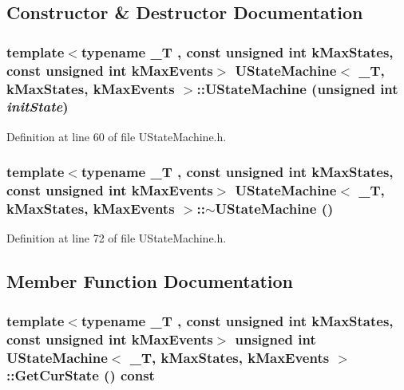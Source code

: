 \subsection{Constructor \& Destructor Documentation}
\hypertarget{class_u_state_machine_482d71ab249a93962a3e969c7cb8820b}{
\subsubsection[{UStateMachine}]{\setlength{\rightskip}{0pt plus 5cm}template$<$typename \_\-T , const unsigned int kMaxStates, const unsigned int kMaxEvents$>$ {\bf UStateMachine}$<$ \_\-T, kMaxStates, kMaxEvents $>$::{\bf UStateMachine} (unsigned int {\em initState})}}
\label{class_u_state_machine_482d71ab249a93962a3e969c7cb8820b}




Definition at line 60 of file UStateMachine.h.\hypertarget{class_u_state_machine_55bfac71d1d2793f130f351151e12768}{
\subsubsection[{$\sim$UStateMachine}]{\setlength{\rightskip}{0pt plus 5cm}template$<$typename \_\-T , const unsigned int kMaxStates, const unsigned int kMaxEvents$>$ {\bf UStateMachine}$<$ \_\-T, kMaxStates, kMaxEvents $>$::$\sim${\bf UStateMachine} ()}}
\label{class_u_state_machine_55bfac71d1d2793f130f351151e12768}




Definition at line 72 of file UStateMachine.h.

\subsection{Member Function Documentation}
\hypertarget{class_u_state_machine_74c99f3a70fa39b073a5aad8df25e4ed}{
\subsubsection[{GetCurState}]{\setlength{\rightskip}{0pt plus 5cm}template$<$typename \_\-T , const unsigned int kMaxStates, const unsigned int kMaxEvents$>$ unsigned int {\bf UStateMachine}$<$ \_\-T, kMaxStates, kMaxEvents $>$::GetCurState () const}}
\label{class_u_state_machine_74c99f3a70fa39b073a5aad8df25e4ed}




